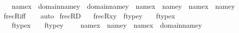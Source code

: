 \begin{isabellebody}
\ \ \ \ \ \ {\isacharparenleft}{\kern0pt}name{}{\isacharparenleft}{\kern0pt}x{\isacharparenright}{\kern0pt}\ {\isasymin}\ domain{\isacharparenleft}{\kern0pt}name{}{\isacharparenleft}{\kern0pt}y{\isacharparenright}{\kern0pt}{\isacharparenright}{\kern0pt}\ {\isasymunion}\ domain{\isacharparenleft}{\kern0pt}name{}{\isacharparenleft}{\kern0pt}y{\isacharparenright}{\kern0pt}{\isacharparenright}{\kern0pt}\ {\isasymand}\ {\isacharparenleft}{\kern0pt}name{}{\isacharparenleft}{\kern0pt}x{\isacharparenright}{\kern0pt}\ {\isacharequal}{\kern0pt}\ name{}{\isacharparenleft}{\kern0pt}y{\isacharparenright}{\kern0pt}\ {\isasymor}\ name{}{\isacharparenleft}{\kern0pt}x{\isacharparenright}{\kern0pt}\ {\isacharequal}{\kern0pt}\ name{}{\isacharparenleft}{\kern0pt}y{\isacharparenright}{\kern0pt}{\isacharparenright}{\kern0pt}{\isacharparenright}{\kern0pt}{\isachardoublequoteclose}\isanewline
%
\isadelimproof
\ \ %
\endisadelimproof
%
\isatagproof
{}\isamarkupfalse%
\ frecR{\isacharunderscore}{\kern0pt}iff\isanewline
\ \ \isamarkupfalse%
\ auto%
\endisatagproof
{\isafoldproof}%
%
\isadelimproof
\isanewline
%
\endisadelimproof
\isanewline
{}\isamarkupfalse%
\ frecR{\isacharunderscore}{\kern0pt}D{}\ {\isacharcolon}{\kern0pt}\isanewline
\ \ {\isachardoublequoteopen}frecR{\isacharparenleft}{\kern0pt}x{\isacharcomma}{\kern0pt}y{\isacharparenright}{\kern0pt}\ {\isasymLongrightarrow}\ ftype{\isacharparenleft}{\kern0pt}y{\isacharparenright}{\kern0pt}\ {\isacharequal}{\kern0pt}\ {}\ {\isasymLongrightarrow}\ ftype{\isacharparenleft}{\kern0pt}x{\isacharparenright}{\kern0pt}\ {\isacharequal}{\kern0pt}\ {}\ {\isasymand}\ \isanewline
\ \ \ \ \ \ ftype{\isacharparenleft}{\kern0pt}x{\isacharparenright}{\kern0pt}\ {\isacharequal}{\kern0pt}\ {}\ {\isasymand}\ ftype{\isacharparenleft}{\kern0pt}y{\isacharparenright}{\kern0pt}\ {\isacharequal}{\kern0pt}\ \ {}\ {\isasymand}\ name{}{\isacharparenleft}{\kern0pt}x{\isacharparenright}{\kern0pt}\ {\isacharequal}{\kern0pt}\ name{}{\isacharparenleft}{\kern0pt}y{\isacharparenright}{\kern0pt}\ {\isasymand}\ name{}{\isacharparenleft}{\kern0pt}x{\isacharparenright}{\kern0pt}\ {\isasymin}\ domain{\isacharparenleft}{\kern0pt}name{}{\isacharparenleft}{\kern0pt}y{\isacharparenright}{\kern0pt}{\isacharparenright}{\kern0pt}{\isachardoublequoteclose}\isanewline
%
\isadelimproof
\ \ %
\endisadelimproof
%
\isatagproof
{}\isamarkupfalse%

\end{isabellebody}
